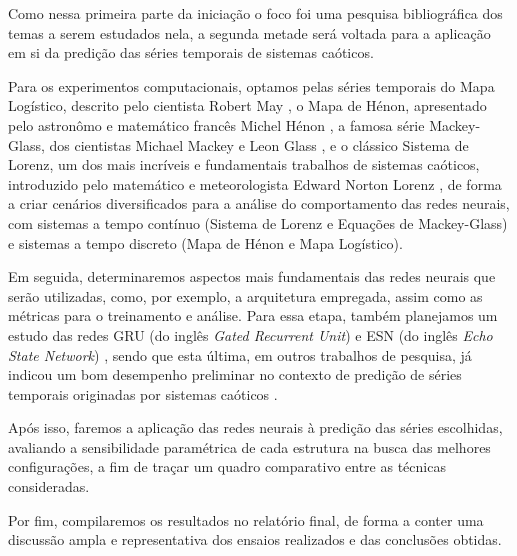 \documentclass[a4paper, 12pt]{article}
\begin{document}
Como nessa primeira parte da iniciação o foco foi uma pesquisa bibliográfica dos temas a serem estudados nela, a segunda metade será voltada para a aplicação em si da predição das séries temporais de sistemas caóticos.

Para os experimentos computacionais, optamos pelas séries temporais do Mapa Logístico, descrito pelo cientista Robert May \cite{may1976simple}, o Mapa de Hénon, apresentado pelo astronômo e matemático francês Michel Hénon \cite{henon1976two}, a famosa série Mackey-Glass, dos cientistas Michael Mackey e Leon Glass \cite{mackey1977oscillation}, e o clássico Sistema de Lorenz, um dos  mais incríveis e fundamentais trabalhos de sistemas caóticos, introduzido pelo matemático e meteorologista Edward Norton Lorenz \cite{lorenz1963deterministic}, de forma a criar cenários diversificados para a análise do comportamento das redes neurais, com sistemas a tempo contínuo (Sistema de Lorenz e Equações de Mackey-Glass) e sistemas a tempo discreto (Mapa de Hénon e Mapa Logístico).

Em seguida, determinaremos aspectos mais fundamentais das redes neurais que serão utilizadas, como, por exemplo, a arquitetura empregada, assim como as métricas para o treinamento e análise. Para essa etapa, também planejamos um estudo das redes GRU (do inglês \textit{Gated Recurrent Unit}) \cite{cho2014learning} e ESN (do inglês \textit{Echo State Network}) \cite{jaeger2007echo}, sendo que esta última, em outros trabalhos de pesquisa, já indicou um bom desempenho preliminar no contexto de predição de séries temporais originadas por sistemas caóticos \cite{boccato2013novas}.

Após isso, faremos a aplicação das redes neurais à predição das séries escolhidas, avaliando a sensibilidade paramétrica de cada estrutura na busca das melhores configurações, a fim de traçar um quadro comparativo entre as técnicas consideradas. 

Por fim, compilaremos os resultados no relatório final, de forma a conter uma discussão ampla e representativa dos ensaios realizados e das conclusões obtidas. 




\end{document}
